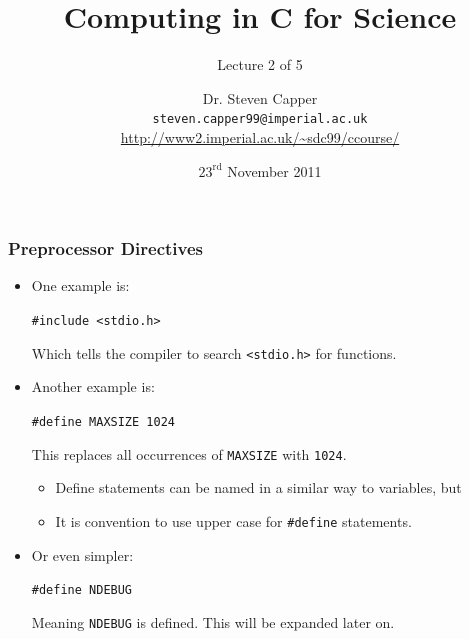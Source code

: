 \documentclass[table]{beamer}
\newif\ifschigh\schighfalse
\newcommand{\kw}[1]{\ifschigh\textcolor{red}{#1}\else\textcolor{keyword}{#1}\fi}
\newcommand{\kt}[1]{\ifschigh\textcolor{red}{#1}\else\textcolor{ctext}{#1}\fi}
\let\oldurl=\url
\renewcommand{\url}[1]{\textcolor{blue}{\oldurl{#1}}}
\begin{document}

\title[C for Science - Lecture 2]{Computing in C for Science}
\subtitle{Lecture 2 of 5}

\author[Steven Capper]{Dr. Steven Capper \\ {\tt steven.capper99@imperial.ac.uk}\\
\url{http://www2.imperial.ac.uk/~sdc99/ccourse/}}

\date{$23^\text{rd}$ November 2011 }

\subject{C for Science} %
{
\begin{frame}
  \titlepage
\end{frame}
}

\begin{frame}
\frametitle{Preprocessor Directives}
\begin{itemize}
\item One example is:
\begin{center}
\tt \kw{\#include} \kt{<stdio.h>}
\end{center}
Which tells the compiler to search \kt{\tt <stdio.h>} for functions.
\item Another example is:
\begin{center}
\tt \kw{\#define} MAXSIZE 1024
\end{center}
This replaces all occurrences of {\tt MAXSIZE} with {\tt 1024}.
\begin{itemize}
\item Define statements can be named in a similar way to variables, but
\item It is convention to use upper case for \kw{\tt \#define} statements.
\end{itemize}
\item Or even simpler:
\begin{center}
\tt \kw{\#define} NDEBUG
\end{center}
Meaning {\tt NDEBUG} is defined. This will be expanded later on.
\end{itemize}
\end{frame}
\end{document}

